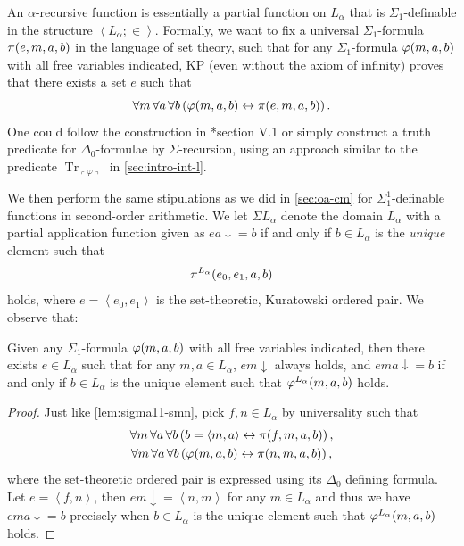 \documentclass[12pt,openany]{book}
\theoremstyle{plain}
\theoremstyle{definition}
\newcommand\tuple[1]{\left\langle #1 \right\rangle}
\newcommand\opA[1]{\mathop{\forall #1}}
\DeclareMathOperator\Tr{Tr}
\newcommand\KP{\mathrm{KP}}
\begin{document}
An $\alpha$-recursive function is essentially a partial function on $L_\alpha$ that is $\Sigma_1$-definable in the structure $\tuple{L_\alpha; \in}$. Formally, we want to fix a universal $\Sigma_1$-formula $\pi\mleft(e, m, a, b\mright)$ in the language of set theory, such that for any $\Sigma_1$-formula $\varphi\mleft(m, a, b\mright)$ with all free variables indicated, $\KP$ (even without the axiom of infinity) proves that there exists a set $e$ such that
\[\opA{m} \opA{a} \opA{b} \left(\varphi\mleft(m, a, b\mright) \leftrightarrow \pi\mleft(e, m, a, b\mright)\right).\]
One could follow the construction in \cite{barwise75-admissible-sets}*{section V.1} or simply construct a truth predicate for $\Delta_0$-formulae by $\Sigma$-recursion, using an approach similar to the predicate $\Tr_{\left\ulcorner \varphi \right\urcorner}$ in \autoref{sec:intro-int-l}.

We then perform the same stipulations as we did in \autoref{sec:oa-cm} for $\Sigma^1_1$-definable functions in second-order arithmetic. We let $\Sigma L_\alpha$ denote the domain $L_\alpha$ with a partial application function given as $ea {\downarrow} = b$ if and only if $b \in L_\alpha$ is the \emph{unique} element such that
\[\pi^{L_\alpha}\mleft(e_0, e_1, a, b\mright)\]
holds, where $e = \tuple{e_0, e_1}$ is the set-theoretic, Kuratowski ordered pair. We observe that:
\begin{lemma}
  \label{lem:sigma-l1-smn}
  Given any $\Sigma_1$-formula $\varphi\mleft(m, a, b\mright)$ with all free variables indicated, then there exists $e \in L_\alpha$ such that for any $m, a \in L_\alpha$, $em {\downarrow}$ always holds, and $ema {\downarrow} = b$ if and only if $b \in L_\alpha$ is the unique element such that $\varphi^{L_\alpha}\mleft(m, a, b\mright)$ holds.
\end{lemma}

\begin{proof}
  Just like \autoref{lem:sigma11-smn}, pick $f, n \in L_\alpha$ by universality such that
  \begin{gather*}
    \opA{m} \opA{a} \opA{b} \left(b = \tuple{m, a} \leftrightarrow \pi\mleft(f, m, a, b\mright)\right), \\
    \opA{m} \opA{a} \opA{b} \left(\varphi\mleft(m, a, b\mright) \leftrightarrow \pi\mleft(n, m, a, b\mright)\right),
  \end{gather*}
  where the set-theoretic ordered pair is expressed using its $\Delta_0$ defining formula. Let $e = \tuple{f, n}$, then $em {\downarrow} = \tuple{n, m}$ for any $m \in L_\alpha$ and thus we have $ema {\downarrow} = b$ precisely when $b \in L_\alpha$ is the unique element such that $\varphi^{L_\alpha}\mleft(m, a, b\mright)$ holds.
\end{proof}
\end{document}
